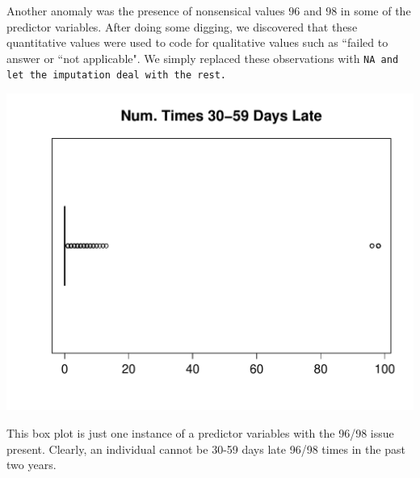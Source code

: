 \documentclass[11pt, oneside]{article}   	%
\begin{document}
	
	Another anomaly was the presence of nonsensical values $96$ and $98$ 
	in some of the predictor variables. After doing some digging, we discovered that 
	these quantitative values were used to code for qualitative values such as 
	``failed to answer or ``not applicable". We simply replaced these observations with
	\tt NA\rm~and let the imputation deal with the rest.
	\begin{center}
	\includegraphics[scale=0.5]{96}
	\end{center}
	This box plot is just one instance of a predictor variables with the 96/98 issue present. Clearly,
	an individual cannot be 30-59 days late 96/98 times in the past two years.
	
\end{document}
